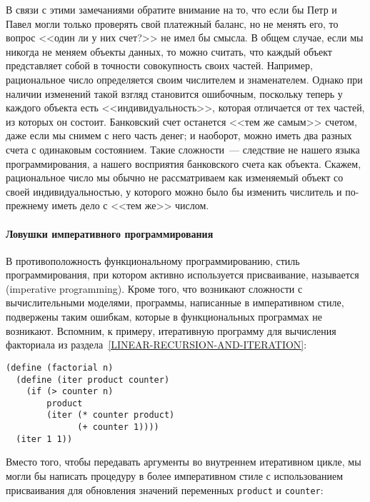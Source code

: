 В связи с этими замечаниями обратите внимание на то, что
если бы Петр и Павел могли только проверять свой платежный баланс,
но не менять его, то вопрос <<один ли у них счет?>> не имел бы
смысла.  В общем случае, если мы никогда не меняем объекты данных, то
можно считать, что каждый объект представляет собой в точности
совокупность своих частей.
Например, рациональное число определяется своим числителем и
знаменателем.  Однако при наличии изменений такой взгляд становится
ошибочным, поскольку теперь у каждого объекта есть <<индивидуальность>>,
которая отличается от тех частей, из которых он состоит.  Банковский
счет останется <<тем же самым>> счетом, даже если мы снимем с него часть
денег; и наоборот, можно иметь два разных счета с одинаковым
состоянием.  Такие сложности~--- следствие не нашего языка
программирования, а нашего восприятия банковского счета как объекта.
Скажем, рациональное число мы обычно не рассматриваем как изменяемый
объект со своей индивидуальностью, у которого можно было бы изменить
числитель и по-прежнему иметь дело с <<тем же>> числом.

\paragraph{Ловушки императивного программирования}


В противоположность функциональному программированию,
стиль программирования, при котором активно используется присваивание,
называется
 (imperative programming).  Кроме того, что возникают сложности
с вычислительными моделями, программы, написанные в императивном стиле,
подвержены таким ошибкам, которые в функциональных программах не
возникают.  Вспомним, к примеру, итеративную программу для вычисления
факториала из раздела~\ref{LINEAR-RECURSION-AND-ITERATION}:

\begin{Verbatim}[fontsize=\small]
(define (factorial n)
  (define (iter product counter)
    (if (> counter n)
        product
        (iter (* counter product)
              (+ counter 1))))
  (iter 1 1))
\end{Verbatim}
Вместо того, чтобы передавать аргументы во внутреннем итеративном
цикле, мы могли бы написать процедуру в более императивном стиле с
использованием присваивания для обновления значений переменных
{\tt product} и {\tt counter}:

